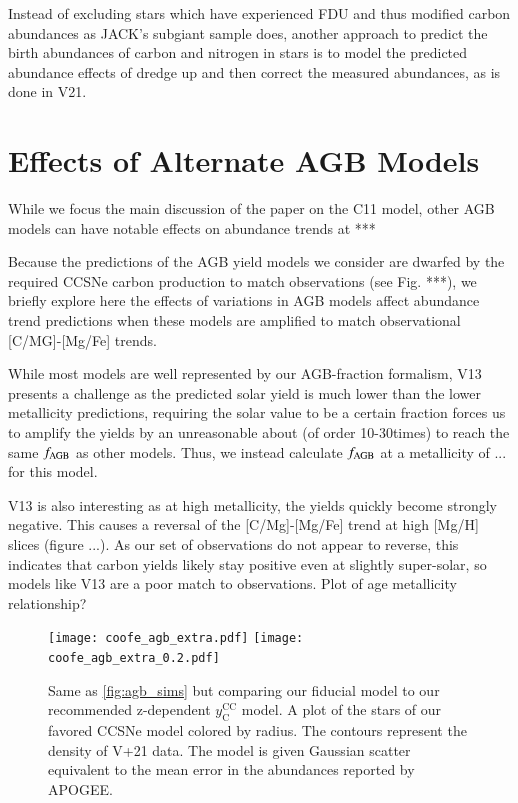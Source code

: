 \documentclass[12pt,oneside]{report}
\begin{document}
Instead of excluding stars which have experienced FDU and thus modified carbon abundances as JACK's subgiant sample does, another approach to predict the birth abundances of carbon and nitrogen in stars is to model the predicted abundance effects of dredge up and then correct the measured abundances, as is done in V21. 


\newpage
\section{Effects of Alternate AGB Models}\label{sec:alt_agb}


While we focus the main discussion of the paper on the C11 model, other AGB models can have notable effects on abundance trends at ***

Because the predictions of the AGB yield models we consider are dwarfed by the
required CCSNe carbon production to match observations (see Fig. ***), we briefly explore here the effects of variations in AGB models affect abundance trend predictions when these models are amplified to match observational [C/MG]-[Mg/Fe] trends. 

While most models are well represented by our AGB-fraction formalism, V13 presents a challenge as the predicted solar yield is much lower than the lower metallicity predictions, requiring the solar value to be a certain fraction forces us to amplify the yields by an unreasonable about (of order 10-30times) to reach the same $f_{\rm AGB}$ as other models. Thus, we instead calculate $f_{\rm AGB}$ at a metallicity of ... for this model. 

V13 is also interesting as at high metallicity, the yields quickly become strongly negative. This causes a reversal of the [C/Mg]-[Mg/Fe] trend at high [Mg/H] slices (figure ...). As our set of observations do not appear to reverse, this indicates that carbon yields likely stay positive even at slightly super-solar, so models like V13 are a poor match to observations. 
Plot of age metallicity relationship?


\begin{figure}[htp]
    \texttt{[image: coofe\_agb\_extra.pdf]}
    \texttt{[image: coofe\_agb\_extra\_0.2.pdf]}

    \caption[Alternate AGB models]{Same as \ref{fig:agb_sims} but comparing our fiducial model to our recommended z-dependent $y_\text{C}^\text{CC}$ model. A plot of the stars of our favored CCSNe model colored by radius. The contours represent the density of V+21 data. The model is given Gaussian scatter equivalent to the mean error in the abundances reported by APOGEE. }
\end{figure}




\label{lastpage}
\end{document}
